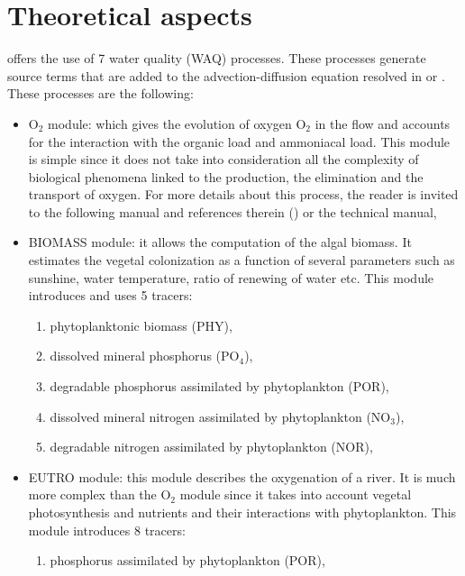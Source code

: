 \chapter{Theoretical aspects}

\waqtel offers the use of 7 water quality (WAQ) processes.
These processes generate source terms that are added to the advection-diffusion equation
resolved in  or .
These processes are the following:

\begin{itemize}
\item O$_2$ module: which gives the evolution of oxygen O$_2$ in the flow
  and accounts for the interaction with the organic load and ammoniacal load.
  This module is simple since it does not take into consideration
  all the complexity of biological phenomena linked to the production,
  the elimination and the transport of oxygen.
  For more details about this process, the reader is invited
  to the following manual and references therein (\cite{El-Kadi2012})
  or the \waqtel technical manual,

\item BIOMASS module: it allows the computation of the algal biomass.
  It estimates the vegetal colonization as a function of several parameters
  such as sunshine, water temperature, ratio of renewing of water etc.
  This module introduces and uses 5 tracers:

\begin{enumerate}
\item phytoplanktonic biomass (PHY),

\item dissolved mineral phosphorus (PO$_4$),

\item degradable phosphorus assimilated by phytoplankton (POR),

\item dissolved mineral nitrogen assimilated by phytoplankton (NO$_3$),

\item degradable nitrogen assimilated by phytoplankton (NOR),
\end{enumerate}

\item EUTRO module: this module describes the oxygenation of a river.
  It is much more complex than the O$_2$ module since it takes into account
  vegetal photosynthesis and nutrients and their interactions with phytoplankton.
  This module introduces 8 tracers:
\begin{enumerate}
\item phosphorus assimilated by phytoplankton (POR),


\end{enumerate}
\end{itemize}
